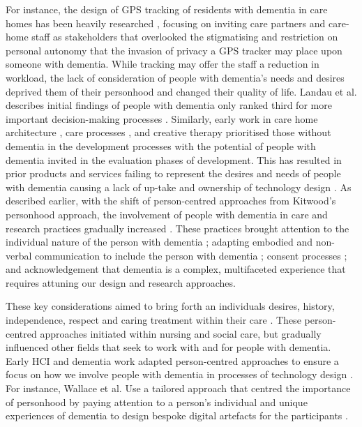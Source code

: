 For instance, the design of GPS tracking of residents with dementia in care homes has been heavily researched \citep{wan_design_2016}, focusing on inviting care partners and care-home staff as stakeholders that overlooked the stigmatising and restriction on personal autonomy that the invasion of privacy a GPS tracker may place upon someone with dementia. While tracking may offer the staff a reduction in workload, the lack of consideration of people with dementia's needs and desires deprived them of their personhood and changed their quality of life. Landau et al. describes initial findings of people with dementia only ranked third for more important decision-making processes \citep{doi:10.1080/13607861003713166}. Similarly, early work in care home architecture \citep{torrington2006has}, care processes \citep{rabins2006practical}, and creative therapy \citep{schmitt2006creative} prioritised those without dementia in the development processes with the potential of people with dementia invited in the evaluation phases of development. This has resulted in prior products and services failing to represent the desires and needs of people with dementia causing a lack of up-take and ownership of technology design \citep{higgins2013involving}. As described earlier, with the shift of person-centred approaches from Kitwood's personhood approach, the involvement of people with dementia in care and research practices gradually increased \citep{dewing_personhood_2008}. These practices brought attention to the individual nature of the person with dementia \citep{fazio_fundamentals_2018}; adapting embodied and non-verbal communication to include the person with dementia \citep{kontos_embodied_2005}; consent processes \citep{dewing_participatory_2007}; and acknowledgement that dementia is a complex, multifaceted experience that requires attuning our design and research approaches.  

These key considerations aimed to bring forth an individuals desires, history, independence, respect and caring treatment within their care \citep{fazio_fundamentals_2018}. These person-centred approaches initiated within nursing and social care, but gradually influenced other fields that seek to work with and for people with dementia. Early HCI and dementia work adapted person-centred approaches to ensure a focus on how we involve people with dementia in processes of technology design \citep{vines_configuring_2013,lindsay_empathy_2012, wallace_making_2013,suijkerbuijk_active_2019}. For instance, Wallace et al. Use a tailored approach that centred the importance of personhood by paying attention to a person's individual and unique experiences of dementia to design bespoke digital artefacts for the participants \citep{wallace_enabling_2012}. 

